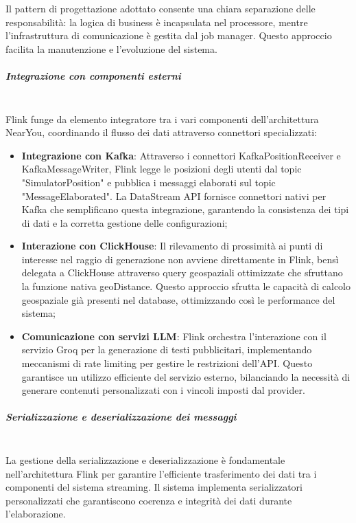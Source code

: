 \documentclass[10pt]{article}
\newcommand{\mysubparagraph}[1]{\subparagraph{#1}\mbox{}\\}
\begin{document}
        Il pattern di progettazione adottato consente una chiara separazione delle responsabilità: la logica di business è incapsulata nel processore, mentre l'infrastruttura di comunicazione è gestita dal job manager. Questo approccio facilita la manutenzione e l'evoluzione del sistema.

        \mysubparagraph{Integrazione con componenti esterni}
        Flink funge da elemento integratore tra i vari componenti dell'architettura NearYou, coordinando il flusso dei dati attraverso connettori specializzati:

        \begin{itemize}
            \item \textbf{Integrazione con Kafka}: Attraverso i connettori KafkaPositionReceiver e KafkaMessageWriter, Flink legge le posizioni degli utenti dal topic "SimulatorPosition" e pubblica i messaggi elaborati sul topic "MessageElaborated". La DataStream API fornisce connettori nativi per Kafka che semplificano questa integrazione, garantendo la consistenza dei tipi di dati e la corretta gestione delle configurazioni;

            \item \textbf{Interazione con ClickHouse}: Il rilevamento di prossimità ai punti di interesse nel raggio di generazione non avviene direttamente in Flink, bensì delegata a ClickHouse attraverso query geospaziali ottimizzate che sfruttano la funzione nativa geoDistance. Questo approccio sfrutta le capacità di calcolo geospaziale già presenti nel database, ottimizzando così le performance del sistema;

            \item \textbf{Comunicazione con servizi LLM}: Flink orchestra l'interazione con il servizio Groq per la generazione di testi pubblicitari, implementando meccanismi di rate limiting per gestire le restrizioni dell'API. Questo garantisce un utilizzo efficiente del servizio esterno, bilanciando la necessità di generare contenuti personalizzati con i vincoli imposti dal provider.
        \end{itemize}

        \mysubparagraph{Serializzazione e deserializzazione dei messaggi}
        La gestione della serializzazione e deserializzazione è fondamentale nell'architettura Flink per garantire l'efficiente trasferimento dei dati tra i componenti del sistema streaming. Il sistema implementa serializzatori personalizzati che garantiscono coerenza e integrità dei dati durante l'elaborazione.
\end{document}
